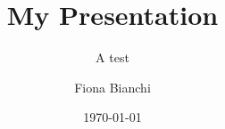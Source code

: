 \documentclass{beamer}
\title{My Presentation}
\subtitle{A test}
\author{Fiona Bianchi}
\date{\today}
\begin{document}
\begin{frame}
\titlepage
\end{frame}
\end{document}
